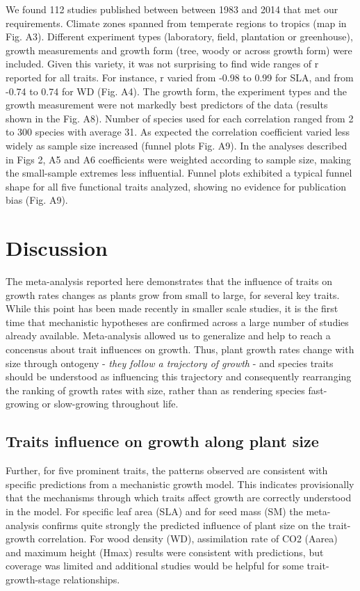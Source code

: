 \documentclass[a4paper]{article}\usepackage[]{graphicx}\usepackage[]{color}
\begin{document}
We found 112 studies published between between 1983 and 2014 that met our requirements. Climate zones spanned from temperate regions to  tropics (map in Fig. A3). Different experiment types (laboratory, field, plantation or greenhouse), growth measurements and growth form (tree, woody or across growth form) were included. Given this variety, it was not surprising to find wide ranges of r reported for all traits. For instance, r varied from -0.98 to 0.99 for SLA, and from -0.74 to 0.74 for WD (Fig. A4). The growth form, the experiment types and the growth measurement were not markedly best predictors of the data (results shown in the Fig. A8). Number of species used for each correlation ranged from 2 to 300 species with average 31. As expected the correlation coefficient varied less widely as sample size increased (funnel plots Fig. A9). In the analyses described in Figs 2, A5 and A6 coefficients were weighted according to sample size, making the small-sample extremes less influential. Funnel plots exhibited a typical funnel shape for all five functional traits analyzed, showing no evidence for publication bias (Fig. A9). 


\section*{Discussion}\label{discussion}

The meta-analysis reported here demonstrates that the influence of traits on growth rates changes as plants grow from small to large, for several key traits. While this point has been made recently in smaller scale studies, it is the first time that mechanistic hypotheses are confirmed across a large number of studies already available. Meta-analysis allowed us to generalize and help to reach a concensus about trait influences on growth. Thus, plant growth rates change with size through ontogeny \citep{Condit:1993hd, Clark:1999ed, Herault:2011dd} - \textit{they follow a trajectory of growth} - and species traits should be understood as influencing this trajectory and consequently rearranging the ranking of growth rates with size, rather than as rendering species fast-growing or slow-growing throughout life. 

\subsection*{Traits influence on growth along plant size}

Further, for five prominent traits, the patterns observed are consistent with specific predictions from a mechanistic growth model. This indicates provisionally that the mechanisms through which traits affect growth are correctly understood in the model. For specific leaf area (SLA) and for seed mass (SM) the meta-analysis confirms quite strongly the predicted influence of plant size on the trait-growth correlation. For wood density (WD), assimilation rate of CO2 (Aarea) and maximum height (Hmax) results were consistent with predictions, but coverage was limited and additional studies would be helpful for some trait-growth-stage relationships. 
\end{document}
